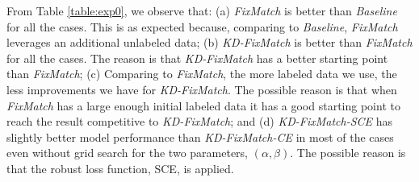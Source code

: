 \documentclass{article}
\DeclarePairedDelimiter\floor{\lfloor}{\rfloor}
\begin{document}
From Table \ref{table:exp0}, we observe that:
(a) {\sl FixMatch} is better than {\sl Baseline} for all the cases.
This is as expected because, comparing to {\sl Baseline}, {\sl FixMatch} leverages an additional unlabeled data;
(b) {\sl KD-FixMatch} is better than {\sl FixMatch} for all the cases.
The reason is that {\sl KD-FixMatch} has a better starting point than {\sl FixMatch};
(c) Comparing to {\sl FixMatch}, the more labeled data we use, the less improvements we have for {\sl KD-FixMatch}.
The possible reason is that when {\sl FixMatch} has a large enough initial labeled data it has a good starting point to reach the result competitive to {\sl KD-FixMatch}; and
(d) {\sl KD-FixMatch-SCE} has slightly better model performance than {\sl KD-FixMatch-CE} in most of the cases even without grid search for the two parameters, $(\alpha, \beta)$.
The possible reason is that the robust loss function, SCE, is applied.
\end{document}
